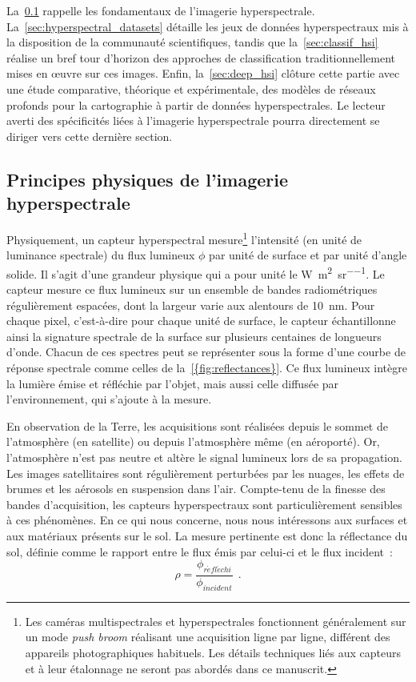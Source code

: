 La~\cref{sec:principes_hsi} rappelle les fondamentaux de l'imagerie hyperspectrale. La~\cref{sec:hyperspectral_datasets} détaille les jeux de données hyperspectraux mis à la disposition de la communauté scientifiques, tandis que la~\cref{sec:classif_hsi} réalise un bref tour d'horizon des approches de classification traditionnellement mises en \oe{}uvre sur ces images. Enfin, la~\cref{sec:deep_hsi} clôture cette partie avec une étude comparative, théorique et expérimentale, des modèles de réseaux profonds pour la cartographie à partir de données hyperspectrales. Le lecteur averti des spécificités liées à l'imagerie hyperspectrale pourra directement se diriger vers cette dernière section.

\subsection{Principes physiques de l'imagerie hyperspectrale}
\label{sec:principes_hsi}

Physiquement, un capteur hyperspectral mesure\footnote{Les caméras multispectrales et hyperspectrales fonctionnent généralement sur un mode \emph{push broom} réalisant une acquisition ligne par ligne, différent des appareils photographiques habituels. Les détails techniques liés aux capteurs et à leur étalonnage ne seront pas abordés dans ce manuscrit.} l'intensité (en unité de luminance spectrale) du flux lumineux $\phi$ par unité de surface et par unité d'angle solide. Il s'agit d'une grandeur physique qui a pour unité le \si{\watt\per\square\meter\per\steradian}. Le capteur mesure ce flux lumineux sur un ensemble de bandes radiométriques régulièrement espacées, dont la largeur varie aux alentours de \SI{10}{\nano\meter}. Pour chaque pixel, c'est-à-dire pour chaque unité de surface, le capteur échantillonne ainsi la signature spectrale de la surface sur plusieurs centaines de longueurs d'onde. Chacun de ces spectres peut se représenter sous la forme d'une courbe de réponse spectrale comme celles de la~\cref{{fig:reflectances}}. Ce flux lumineux intègre la lumière émise et réfléchie par l'objet, mais aussi celle diffusée par l'environnement, qui s'ajoute à la mesure.

En observation de la Terre, les acquisitions sont réalisées depuis le sommet de l'atmosphère (en satellite) ou depuis l'atmosphère même (en aéroporté). Or, l'atmosphère n'est pas neutre et altère le signal lumineux lors de sa propagation. Les images satellitaires sont régulièrement perturbées par les nuages, les effets de brumes et les aérosols en suspension dans l'air. Compte-tenu de la finesse des bandes d'acquisition, les capteurs hyperspectraux sont particulièrement sensibles à ces phénomènes. En ce qui nous concerne, nous nous intéressons aux surfaces et aux matériaux présents sur le sol. La mesure pertinente est donc la réflectance du sol, définie comme le rapport entre le flux émis par celui-ci et le flux incident~:
\begin{equation}
  \rho = \frac{\phi_{\mathit{r\acute{e}fl\acute{e}chi}}}{\phi_\mathit{incident}}~~.
\end{equation}

